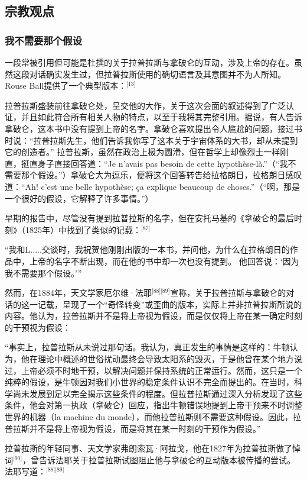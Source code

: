 \subsection{宗教观点}  
\subsubsection{我不需要那个假设}  
一段常被引用但可能是杜撰的关于拉普拉斯与拿破仑的互动，涉及上帝的存在。虽然这段对话确实发生过，但拉普拉斯使用的确切语言及其意图并不为人所知。Rouse Ball提供了一个典型版本：\(^\text{[13]}\)

拉普拉斯盛装前往拿破仑处，呈交他的大作，关于这次会面的叙述得到了广泛认证，并且如此符合所有相关人物的特点，以至于我将其完整引用。据说，有人告诉拿破仑，这本书中没有提到上帝的名字。拿破仑喜欢提出令人尴尬的问题，接过书时说：“拉普拉斯先生，他们告诉我你写了这本关于宇宙体系的大书，却从未提到它的创造者。” 拉普拉斯，虽然在政治上极为圆滑，但在哲学上却像烈士一样刚直，挺直身子直接回答道：“Je n'avais pas besoin de cette hypothèse-là.”（“我不需要那个假设。”）拿破仑大为逗乐，便将这个回答转告给拉格朗日，拉格朗日感叹道：“Ah! c'est une belle hypothèse; ça explique beaucoup de choses.”（“啊，那是一个很好的假设，它解释了许多事情。”）

早期的报告中，尽管没有提到拉普拉斯的名字，但在安托马基的《拿破仑的最后时刻》（1825年）中找到了类似的记载：\(^\text{[87]}\)

“我和L.....交谈时，我祝贺他刚刚出版的一本书，并问他，为什么在拉格朗日的作品中，上帝的名字不断出现，而在他的书中却一次也没有提到。 他回答说：‘因为我不需要那个假设。’”

然而，在1884年，天文学家厄尔维·法耶\(^\text{[88][89]}\)宣称，关于拉普拉斯与拿破仑的对话的这一记载，呈现了一个“奇怪转变”或歪曲的版本，实际上并非拉普拉斯所说的内容。他认为，拉普拉斯并不是将上帝视为假设，而是仅仅将上帝在某一确定时刻的干预视为假设：

“事实上，拉普拉斯从未说过那句话。我认为，真正发生的事情是这样的：牛顿认为，他在理论中概述的世俗扰动最终会导致太阳系的毁灭，于是他曾在某个地方说过，上帝必须不时地干预，以解决问题并保持系统的正常运行。然而，这只是一个纯粹的假设，是牛顿因对我们小世界的稳定条件认识不完全而提出的。在当时，科学尚未发展到足以完全揭示这些条件的程度。但拉普拉斯通过深入分析发现了这些条件，他会对第一执政（拿破仑）回应，指出牛顿错误地提到上帝干预来不时调整世界的机器（la machine du monde），而他拉普拉斯则不需要这种假设。因此，拉普拉斯并不是将上帝视为假设，而是将其在某一时刻的干预作为假设。”

拉普拉斯的年轻同事、天文学家弗朗索瓦·阿拉戈，他在1827年为拉普拉斯做了悼词\(^\text{[90]}\)，曾告诉法耶关于拉普拉斯试图阻止他与拿破仑的互动版本被传播的尝试。法耶写道：\(^\text{[88][89]}\)


